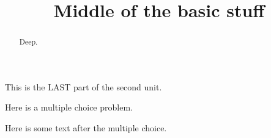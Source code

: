 \documentclass{ximera}
\title{Middle of the basic stuff}
\begin{document}
\begin{abstract}
  Deep.
\end{abstract}

This is the LAST part of the second unit.

\begin{exercise}
  Here is a multiple choice problem.
  \begin{solution}
    \begin{multiple-choice}
    \end{multiple-choice}
  \end{solution}

  Here is some text after the multiple choice.
\end{exercise}
\end{document}
